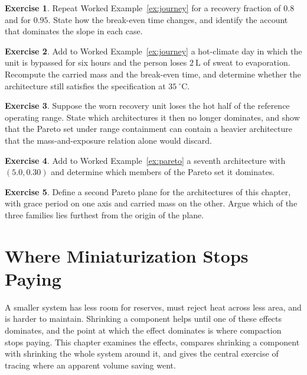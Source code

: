 \documentclass[11pt,openany]{book}
\theoremstyle{definition}
\newtheorem{exercise}{Exercise}[chapter]
\theoremstyle{remark}
\begin{document}
\begin{exercise}
Repeat Worked Example~\ref{ex:journey} for a recovery fraction of $0.8$ and for $0.95$. State how the break-even time changes, and identify the account that dominates the slope in each case.
\end{exercise}

\begin{exercise}
Add to Worked Example~\ref{ex:journey} a hot-climate day in which the unit is bypassed for six hours and the person loses $2\ \mathrm{L}$ of sweat to evaporation. Recompute the carried mass and the break-even time, and determine whether the architecture still satisfies the specification at $35\ ^\circ\mathrm{C}$.
\end{exercise}

\begin{exercise}
Suppose the worn recovery unit loses the hot half of the reference operating range. State which architectures it then no longer dominates, and show that the Pareto set under range containment can contain a heavier architecture that the mass-and-exposure relation alone would discard.
\end{exercise}

\begin{exercise}
Add to Worked Example~\ref{ex:pareto} a seventh architecture with $(5.0,0.30)$ and determine which members of the Pareto set it dominates.
\end{exercise}

\begin{exercise}
Define a second Pareto plane for the architectures of this chapter, with grace period on one axis and carried mass on the other. Argue which of the three families lies furthest from the origin of the plane.
\end{exercise}

\chapter{Where Miniaturization Stops Paying}
\label{ch:limits}

A smaller system has less room for reserves, must reject heat across less area, and is harder to maintain. Shrinking a component helps until one of these effects dominates, and the point at which the effect dominates is where compaction stops paying. This chapter examines the effects, compares shrinking a component with shrinking the whole system around it, and gives the central exercise of tracing where an apparent volume saving went.
\end{document}
